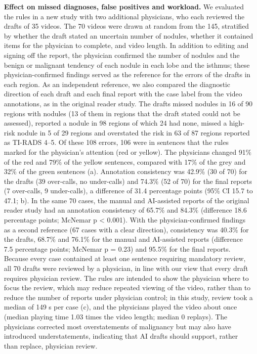 \textbf{Effect on missed diagnoses, false positives and workload.} We evaluated the rules in a new study with two additional physicians, who each reviewed the drafts of 35 videos. The 70 videos were drawn at random from the 145, stratified by whether the draft stated an uncertain number of nodules, whether it contained items for the physician to complete, and video length. In addition to editing and signing off the report, the physician confirmed the number of nodules and the benign or malignant tendency of each nodule in each lobe and the isthmus; these physician-confirmed findings served as the reference for the errors of the drafts in each region. As an independent reference, we also compared the diagnostic direction of each draft and each final report with the case label from the video annotations, as in the original reader study. The drafts missed nodules in 16 of 90 regions with nodules (13 of them in regions that the draft stated could not be assessed), reported a nodule in 98 regions of which 24 had none, missed a high-risk nodule in 5 of 29 regions and overstated the risk in 63 of 87 regions reported as TI-RADS 4--5. Of these 108 errors, 106 were in sentences that the rules marked for the physician's attention (red or yellow). The physicians changed 91\% of the red and 79\% of the yellow sentences, compared with 17\% of the grey and 32\% of the green sentences (a). Annotation consistency was 42.9\% (30 of 70) for the drafts (39 over-calls, no under-calls) and 74.3\% (52 of 70) for the final reports (7 over-calls, 9 under-calls), a difference of 31.4 percentage points (95\% CI 15.7 to 47.1; b). In the same 70 cases, the manual and AI-assisted reports of the original reader study had an annotation consistency of 65.7\% and 84.3\% (difference 18.6 percentage points; McNemar p < 0.001). With the physician-confirmed findings as a second reference (67 cases with a clear direction), consistency was 40.3\% for the drafts, 68.7\% and 76.1\% for the manual and AI-assisted reports (difference 7.5 percentage points; McNemar p = 0.23) and 95.5\% for the final reports. Because every case contained at least one sentence requiring mandatory review, all 70 drafts were reviewed by a physician, in line with our view that every draft requires physician review. The rules are intended to show the physician where to focus the review, which may reduce repeated viewing of the video, rather than to reduce the number of reports under physician control; in this study, review took a median of 149 s per case (c), and the physicians played the video about once (median playing time 1.03 times the video length; median 0 replays). The physicians corrected most overstatements of malignancy but may also have introduced understatements, indicating that AI drafts should support, rather than replace, physician review.\par

